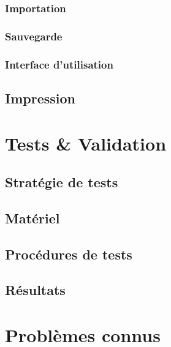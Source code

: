 \documentclass[11pt,a4paper,oldfontcommands]{memoir}
\begin{document}
\subsection{Importation}

\subsection{Sauvegarde}

\subsection{Interface d'utilisation}

\section{Impression}


\chapter{Tests \& Validation}

\section{Stratégie de tests}

\section{Matériel}

\section{Procédures de tests}

\section{Résultats}


\chapter{Problèmes connus}
\end{document}
